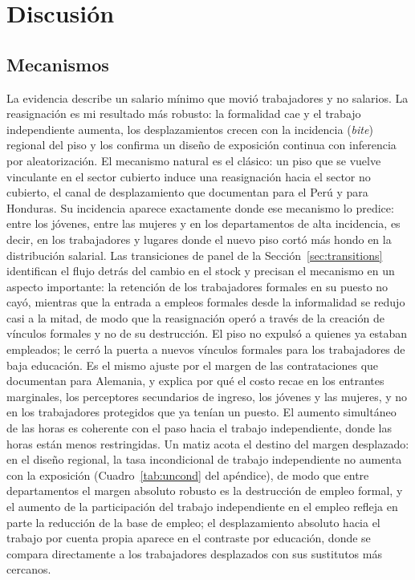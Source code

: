\section{Discusión}\label{sec:discussion}

\subsection{Mecanismos}

La evidencia describe un salario mínimo que movió trabajadores y no salarios. La reasignación es mi resultado más robusto: la formalidad cae y el trabajo independiente aumenta, los desplazamientos crecen con la incidencia (\emph{bite}) regional del piso y los confirma un diseño de exposición continua con inferencia por aleatorización. El mecanismo natural es el clásico: un piso que se vuelve vinculante en el sector cubierto induce una reasignación hacia el sector no cubierto, el canal de desplazamiento que \citet{jaramillo_lopez_2006} documentan para el Perú y \citet{ham_2018_honduras} para Honduras. Su incidencia aparece exactamente donde ese mecanismo lo predice: entre los jóvenes, entre las mujeres y en los departamentos de alta incidencia, es decir, en los trabajadores y lugares donde el nuevo piso cortó más hondo en la distribución salarial. Las transiciones de panel de la Sección~\ref{sec:transitions} identifican el flujo detrás del cambio en el stock y precisan el mecanismo en un aspecto importante: la retención de los trabajadores formales en su puesto no cayó, mientras que la entrada a empleos formales desde la informalidad se redujo casi a la mitad, de modo que la reasignación operó a través de la creación de vínculos formales y no de su destrucción. El piso no expulsó a quienes ya estaban empleados; le cerró la puerta a nuevos vínculos formales para los trabajadores de baja educación. Es el mismo ajuste por el margen de las contrataciones que \citet{dustmann_2022} documentan para Alemania, y explica por qué el costo recae en los entrantes marginales, los perceptores secundarios de ingreso, los jóvenes y las mujeres, y no en los trabajadores protegidos que ya tenían un puesto. El aumento simultáneo de las horas es coherente con el paso hacia el trabajo independiente, donde las horas están menos restringidas. Un matiz acota el destino del margen desplazado: en el diseño regional, la tasa incondicional de trabajo independiente no aumenta con la exposición (Cuadro~\ref{tab:uncond} del apéndice), de modo que entre departamentos el margen absoluto robusto es la destrucción de empleo formal, y el aumento de la participación del trabajo independiente en el empleo refleja en parte la reducción de la base de empleo; el desplazamiento absoluto hacia el trabajo por cuenta propia aparece en el contraste por educación, donde se compara directamente a los trabajadores desplazados con sus sustitutos más cercanos.

